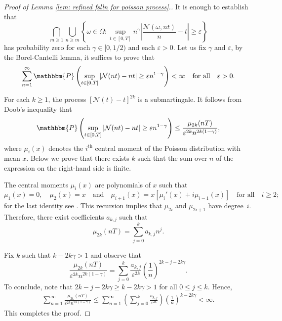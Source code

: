 \documentclass[a4paper, 12pt]{article}
\theoremstyle{definition}
\newcommand{\set}[2]{\left\{#1 : #2\right\}}
\newcommand{\prob}{\mathbbm{P}}
\newcommand{\calN}{\mathcal{N}}
\begin{document}
\begin{appendices}
	\begin{proof}[Proof of Lemma \ref{lem: refined fslln for poisson process}.]
	It is enough to establish that
	\begin{equation*}
		\bigcap_{m \geq 1} \bigcup_{n \geq m} \set{\omega \in \Omega}{\sup_{t \in [0, T]} n^\gamma\left|\frac{\calN(\omega, n t)}{n} - t\right| \geq \varepsilon}
	\end{equation*}
	has probability zero for each $\gamma \in [0, 1/2)$ and each $\varepsilon > 0$. Let us fix $\gamma$ and $\varepsilon$, by the Borel-Cantelli lemma, it suffices to prove that
	\begin{equation*}
		\sum_{n = 1}^\infty \prob\left(\sup_{t \in [0, T]} \left|\calN(n t) - nt\right| \geq \varepsilon n^{1 - \gamma}\right) < \infty \quad \text{for all} \quad \varepsilon > 0.
	\end{equation*}
	
	For each $k \geq 1$, the process $\left[\calN(t) - t\right]^{2k}$ is a submartingale. It follows from Doob's inequality that
	\begin{equation*}
		\prob\left(\sup_{t \in [0, T]} \left|\calN(n t) - nt\right| \geq \varepsilon n^{1 - \gamma}\right) \leq \frac{\mu_{2k}(n T)}{\varepsilon^{2k}n^{2k(1 - \gamma)}},
	\end{equation*}
	where $\mu_i(x)$ denotes the $i^{\text{th}}$ central moment of the Poisson distribution with mean $x$. Below we prove that there exists $k$ such that the sum over $n$ of the expression on the right-hand side is finite.
	
	The central moments $\mu_i(x)$ are polynomials of $x$ such that
	\begin{equation*}
		\mu_1(x) = 0, \quad \mu_2(x) = x \quad \text{and} \quad \mu_{i + 1}(x) = x\left[\mu_i'(x) + i\mu_{i - 1}(x)\right] \quad \text{for all} \quad i \geq 2;
	\end{equation*}
	for the last identity see \cite[Equation (5.22)]{kendall1945advanced}. This recursion implies that $\mu_{2i}$ and $\mu_{2i + 1}$ have degree~$i$. Therefore, there exist coefficients $a_{k, j}$ such that
	\begin{equation*}
		\mu_{2k}(n T) = \sum_{j = 0}^k a_{k, j} n^j.
	\end{equation*}
	
	Fix $k$ such that $k - 2k \gamma > 1$ and observe that
	\begin{equation*}
		\frac{\mu_{2k}(n T)}{\varepsilon^{2k}n^{2k(1 - \gamma)}} = \sum_{j = 0}^k \frac{a_{k, j}}{\varepsilon^{2k}} \left(\frac{1}{n}\right)^{2k - j - 2k\gamma}.
	\end{equation*}
	To conclude, note that $2k - j - 2k\gamma \geq k - 2k\gamma > 1$ for all $0 \leq j \leq k$. Hence,
	\begin{align*}
		\sum_{n = 1}^\infty \frac{\mu_{2k}(n T)}{\varepsilon^{2k}n^{2k(1 - \gamma)}} \leq \sum_{n = 1}^\infty \left(\sum_{j = 0}^k \frac{a_{k, j}}{\varepsilon^{2k}}\right) \left(\frac{1}{n}\right)^{k - 2k\gamma} < \infty.
	\end{align*}
	This completes the proof.
	\end{proof}
	

\end{appendices}
\end{document}
